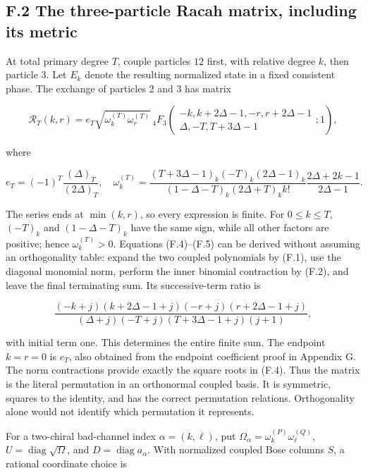 \hypertarget{f.2-the-three-particle-racah-matrix-including-its-metric}{%
\subsection{F.2 The three-particle Racah matrix, including its metric}\label{f.2-the-three-particle-racah-matrix-including-its-metric}}

At total primary degree \(T\), couple particles \(12\) first, with relative degree \(k\), then particle 3. Let \(E_k\) denote the resulting normalized state in a fixed consistent phase. The exchange of particles 2 and 3 has matrix

\[
\mathcal R_T(k,r)=e_T\sqrt{\omega_k^{(T)}\omega_r^{(T)}}
\,{}_4F_3\!\left(
\begin{matrix}-k,k+2\Delta-1,-r,r+2\Delta-1\\
\Delta,-T,T+3\Delta-1\end{matrix};1\right),
\tag{F.4}
\]

where

\[
e_T=(-1)^T\frac{(\Delta)_T}{(2\Delta)_T},
\quad
\omega_k^{(T)}=
\frac{(T+3\Delta-1)_k(-T)_k(2\Delta-1)_k}
{(1-\Delta-T)_k(2\Delta+T)_k k!}
\frac{2\Delta+2k-1}{2\Delta-1}.
\tag{F.5}
\]

The series ends at \(\min(k,r)\), so every expression is finite. For \(0\le k\le T\), \((-T)_k\) and \((1-\Delta-T)_k\) have the same sign, while all other factors are positive; hence \(\omega_k^{(T)}>0\). Equations (F.4)--(F.5) can be derived without assuming an orthogonality table: expand the two coupled polynomials by (F.1), use the diagonal monomial norm, perform the inner binomial contraction by (F.2), and leave the final terminating sum. Its successive-term ratio is

\[
\frac{(-k+j)(k+2\Delta-1+j)(-r+j)(r+2\Delta-1+j)}
{(\Delta+j)(-T+j)(T+3\Delta-1+j)(j+1)},
\tag{F.6}
\]

with initial term one. This determines the entire finite sum. The endpoint \(k=r=0\) is \(e_T\), also obtained from the endpoint coefficient proof in Appendix G. The norm contractions provide exactly the square roots in (F.4). Thus the matrix is the literal permutation in an orthonormal coupled basis. It is symmetric, squares to the identity, and has the correct permutation relations. Orthogonality alone would not identify which permutation it represents.

For a two-chiral bad-channel index \(\alpha=(k,\ell)\), put \(\Omega_\alpha=\omega_k^{(P)}\omega_\ell^{(Q)}\), \(U=\operatorname{diag}\sqrt\Omega\), and \(D=\operatorname{diag}a_\alpha\). With normalized coupled Bose columns \(S\), a rational coordinate choice is

